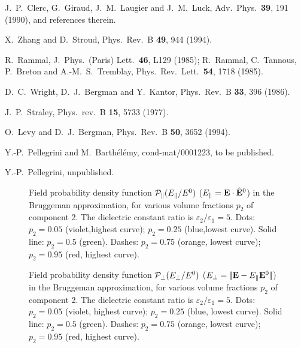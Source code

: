 \begin{thebibliography}{99}
 J.\ P.\ Clerc, G.\ Giraud, J.\ M.\ Laugier
and J.\ M.\ Luck, Adv.\ Phys.\ {\bf 39}, 191 (1990),
and references therein.

 X.\ Zhang and D.\ Stroud,
Phys.\ Rev.\ B {\bf 49}, 944 (1994).

 R.\ Rammal, J.\ Phys.\ (Paris) Lett.\ {\bf 46}, L129 (1985);
R.\ Rammal, C.\ Tannous, P.\ Breton and A.-M.\ S.\ Tremblay,
Phys.\ Rev.\ Lett.\ {\bf 54}, 1718 (1985).

 D.\ C.\ Wright, D.\ J.\ Bergman and Y.\ Kantor,
Phys.\ Rev.\ B {\bf 33}, 396 (1986).

 J.\ P.\ Straley,
Phys.\ rev.\ B {\bf 15}, 5733 (1977).

 O.\ Levy and D.\ J.\ Bergman,
Phys.\ Rev.\ B {\bf 50}, 3652 (1994).

 Y.-P.\ Pellegrini and M.\ Barth\'{e}l\'{e}my, cond-mat/0001223, to be published.

 Y.-P.\ Pellegrini, unpublished.

\end{thebibliography}

\twocolumn
\begin{figure}
\narrowtext
\vspace*{0.0cm}
\centerline{ }
\vspace*{0.0cm}
\caption{Field probability density function  ${\cal{P}}_\parallel(E_\parallel/E^0)$  ($E_\parallel={\bf E}\cdot\hat{\bf E}^0$) in the  Bruggeman approximation, for various volume fractions  $p_2$ of component 2. The dielectric constant ratio is  $\varepsilon_2/\varepsilon_1=5$. Dots: $p_2=0.05$  (violet,highest curve); $p_2=0.25$ (blue,lowest curve).  Solid line: $p_2=0.5$ (green). Dashes: $p_2=0.75$  (orange, lowest curve); $p_2=0.95$ (red, highest curve). }
\label{fig1}
\end{figure}

\begin{figure}
\narrowtext
\vspace*{0.0cm}
\centerline{ }
\vspace*{0.0cm}
\caption{Field probability density function  ${\cal{P}}_\perp(E_\perp/E^0)$  ($E_\perp=|\!|{\bf E}-E_\parallel{\bf E}^0|\!|$)  in the Bruggeman approximation, for various volume  fractions $p_2$ of component 2. The dielectric  constant ratio is $\varepsilon_2/\varepsilon_1=5$.  Dots: $p_2=0.05$ (violet, highest curve); $p_2=0.25$  (blue, lowest curve). Solid line: $p_2=0.5$ (green). Dashes:  $p_2=0.75$ (orange, lowest curve); $p_2=0.95$ (red, highest curve). }
\label{fig2}
\end{figure}

